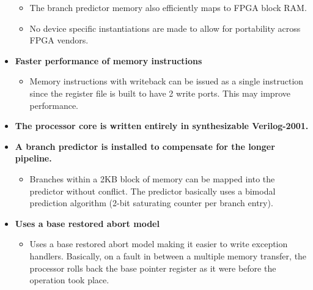 \documentclass[11pt]{article}
\begin{document}
\begin{itemize}
\begin{itemize}
        \item The branch predictor memory also efficiently maps to FPGA block
        RAM.

        \item No device specific instantiations are made to allow for portability
        across FPGA vendors.

        \end{itemize}

\item \textbf{Faster performance of memory instructions}

        \begin{itemize}

        \item Memory instructions with writeback can be issued as a
        single instruction since the register file is built to have 2 write
        ports. This may improve performance.

        \end{itemize}

\item 
        \textbf{The processor core is written entirely in synthesizable 
        Verilog-2001.}

\item \textbf{A branch predictor is installed to compensate for the longer 
        pipeline.}

        \begin{itemize}

        \item Branches within a 2KB block of memory can be mapped into the 
        predictor without conflict. The predictor basically uses a bimodal
        prediction algorithm (2-bit saturating counter per branch entry).

        \end{itemize}

\item \textbf{Uses a base restored abort model}

        \begin{itemize}

        \item
        Uses a base restored abort model making it easier to write exception
        handlers. Basically, on a fault in between a multiple memory transfer, 
        the processor rolls back the base pointer register as it were before 
        the operation took place.

        \end{itemize}

\end{itemize}
\end{document}
